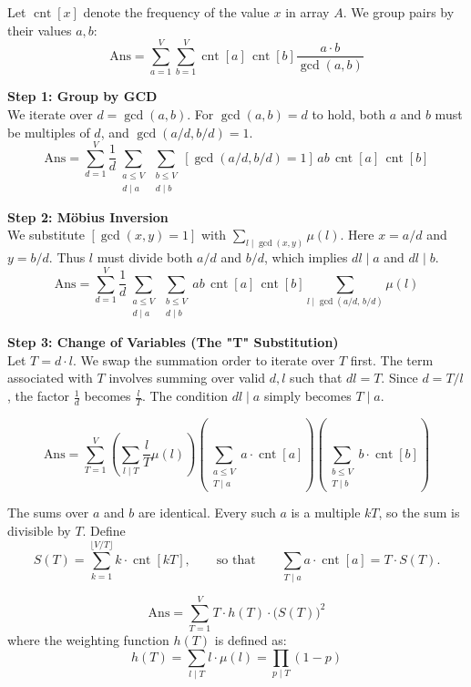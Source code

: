 \documentclass[11pt]{article}
\newcommand{\cnt}{\operatorname{cnt}}
\begin{document}
\begin{derivation}
    Let $\cnt[x]$ denote the frequency of the value $x$ in array $A$. We group pairs by their values $a, b$:
    \[ \text{Ans} = \sum_{a=1}^V \sum_{b=1}^V \cnt[a]\,\cnt[b] \frac{a \cdot b}{\gcd(a, b)} \]

    \textbf{Step 1: Group by GCD} \\
    We iterate over $d = \gcd(a, b)$. For $\gcd(a, b) = d$ to hold, both $a$ and $b$ must be multiples of $d$, and $\gcd(a/d, b/d) = 1$.
    \[ \text{Ans} = \sum_{d=1}^V \frac{1}{d} \sum_{\substack{a \le V \\ d \mid a}} \sum_{\substack{b \le V \\ d \mid b}} [\gcd(a/d, b/d) = 1]\, ab\, \cnt[a]\, \cnt[b] \]

    \textbf{Step 2: Möbius Inversion} \\
    We substitute $[\gcd(x, y) = 1]$ with $\sum_{l \mid \gcd(x, y)} \mu(l)$.
    Here $x = a/d$ and $y = b/d$. Thus $l$ must divide both $a/d$ and $b/d$, which implies $dl \mid a$ and $dl \mid b$.
    \[ \text{Ans} = \sum_{d=1}^V \frac{1}{d} \sum_{\substack{a \le V \\ d \mid a}} \sum_{\substack{b \le V \\ d \mid b}} ab\, \cnt[a]\, \cnt[b] \sum_{l \mid \gcd(a/d,\, b/d)} \mu(l) \]

    \textbf{Step 3: Change of Variables (The "T" Substitution)} \\
    Let $T = d \cdot l$. We swap the summation order to iterate over $T$ first.
    The term associated with $T$ involves summing over valid $d, l$ such that $dl = T$.
    Since $d = T/l$, the factor $\frac{1}{d}$ becomes $\frac{l}{T}$.
    The condition $dl \mid a$ simply becomes $T \mid a$.

    \[ \text{Ans} = \sum_{T=1}^V \left( \sum_{l \mid T} \frac{l}{T} \mu(l) \right) \left( \sum_{\substack{a \le V \\ T \mid a}} a \cdot \cnt[a] \right) \left( \sum_{\substack{b \le V \\ T \mid b}} b \cdot \cnt[b] \right) \]

    The sums over $a$ and $b$ are identical. Every such $a$ is a multiple $kT$, so the sum is divisible by $T$. Define
    \[ S(T) = \sum_{k=1}^{\lfloor V/T \rfloor} k \cdot \cnt[kT], \qquad \text{so that} \qquad \sum_{T \mid a} a \cdot \cnt[a] = T \cdot S(T). \]
\end{derivation}

\begin{resultbox}
    \begin{equation}
        \text{Ans} = \sum_{T=1}^V T \cdot h(T) \cdot \big(S(T)\big)^2
    \end{equation}
    where the weighting function $h(T)$ is defined as:
    \[ h(T) = \sum_{l \mid T} l \cdot \mu(l) = \prod_{p \mid T} (1-p) \]
\end{resultbox}
\end{document}
